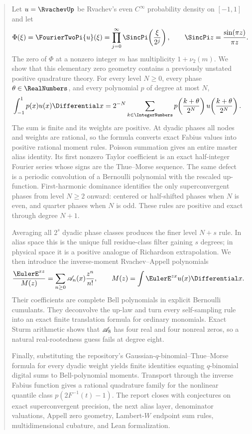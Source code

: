 \documentclass[11pt,oneside]{article}
\numberwithin{equation}{section}
\theoremstyle{definition}
\theoremstyle{remark}
\begin{document}
\hypersetup{pageanchor=false}



\clearpage
\hypersetup{pageanchor=true}

\begin{abstract}
Let $u=\RvachevUp$ be Rvachev's even $C^\infty$ probability density on $[-1,1]$ and let
\[
 \Phi(\xi)=\FourierTwoPi{u}(\xi)
 =\prod_{j=0}^{\infty}\SincPi\!\left(\frac{\xi}{2^j}\right),
 \qquad \SincPi z=\frac{\sin(\pi z)}{\pi z}.
\]
The zero of $\Phi$ at a nonzero integer $m$ has multiplicity $1+\nu_2(m)$.  We show that this elementary zero geometry contains a previously unstated positive quadrature theory.  For every level $N\ge0$, every phase $\theta\in\RealNumbers$, and every polynomial $p$ of degree at most $N$,
\[
 \int_{-1}^{1}p(x)u(x)\Differential x
 =2^{-N}\sum_{k\in\IntegerNumbers}
 p\!\left(\frac{k+\theta}{2^N}\right)
 u\!\left(\frac{k+\theta}{2^N}\right).
\]
The sum is finite and its weights are positive.  At dyadic phases all nodes and weights are rational, so the formula converts exact Fabius values into positive rational moment rules.  Poisson summation gives an entire master alias identity.  Its first nonzero Taylor coefficient is an exact half-integer Fourier series whose signs are the Thue--Morse sequence.  The same defect is a periodic convolution of a Bernoulli polynomial with the rescaled up-function.  First-harmonic dominance identifies the only superconvergent phases from level $N\ge2$ onward: centered or half-shifted phases when $N$ is even, and quarter phases when $N$ is odd.  These rules are positive and exact through degree $N+1$.

Averaging all $2^s$ dyadic phase classes produces the finer level $N+s$ rule.  In alias space this is the unique full residue-class filter gaining $s$ degrees; in physical space it is a positive analogue of Richardson extrapolation.  We then introduce the inverse-moment Rvachev--Appell polynomials
\[
 \frac{\EulerE^{xz}}{M(z)}=\sum_{n\ge0}\Acal_n(x)\frac{z^n}{n!},
 \qquad
 M(z)=\int\EulerE^{zx}u(x)\Differential x.
\]
Their coefficients are complete Bell polynomials in explicit Bernoulli cumulants.  They deconvolve the up-law and turn every self-sampling rule into an exact finite translation formula for ordinary monomials.  Exact Sturm arithmetic shows that $\Acal_8$ has four real and four nonreal zeros, so a natural real-rootedness guess fails at degree eight.

Finally, substituting the repository's Gaussian-$q$-binomial--Thue--Morse formula for every dyadic weight yields finite identities equating $q$-binomial digital sums to Bell-polynomial moments.  Transport through the inverse Fabius function gives a rational quadrature family for the nonlinear quantile class $p(2F^{-1}(t)-1)$.  The report closes with conjectures on exact superconvergent precision, the next alias layer, denominator valuations, Appell zero geometry, Lambert-$W$ endpoint sum rules, multidimensional cubature, and Lean formalization.
\end{abstract}
\end{document}
